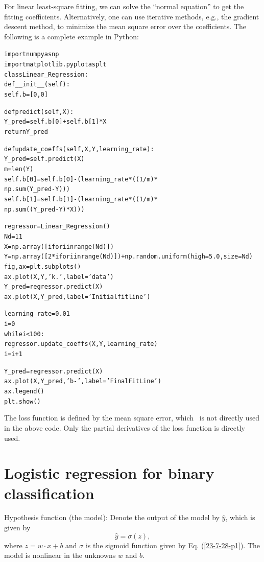 \documentclass{article}
\newenvironment{tmcode}[1][]{\begin{alltt} }{\end{alltt}}
\begin{document}
For linear least-square fitting, we can solve the ``normal equation'' to get
the fitting coefficients. Alternatively, one can use iterative methods, e.g.,
the gradient descent method, to minimize the mean square error over the
coefficients. The following is a complete example in Python:
\begin{tmcode}
import numpy as np
import matplotlib.pyplot as plt
class Linear_Regression:
    def __init__(self):
            self.b = [0, 0]
            
    def predict(self, X):
            Y_pred = self.b[0] + self.b[1]*X
            return Y_pred

    def update_coeffs(self, X, Y, learning_rate):
            Y_pred = self.predict(X)
            m = len(Y)
            self.b[0] = self.b[0] - (learning_rate * ((1/m) *
                                                      np.sum(Y_pred - Y)))
            self.b[1] = self.b[1] - (learning_rate * ((1/m) *
                                                      np.sum((Y_pred - Y) * X)))
 
 
regressor = Linear_Regression()
Nd=11
X = np.array([i for i in range(Nd)])
Y = np.array([2*i for i in range(Nd)]) + np.random.uniform(high=5.0,size=Nd)
fig, ax = plt.subplots()
ax.plot(X,Y, 'k.',label='data') 
Y_pred = regressor.predict(X)
ax.plot(X, Y_pred, label='Initial fit line')

learning_rate = 0.01
i = 0
while i<100:
    regressor.update_coeffs(X,Y,learning_rate)
    i = i+1

Y_pred = regressor.predict(X)
ax.plot(X, Y_pred, 'b-',label='Final Fit Line')
ax.legend()
plt.show()
\end{tmcode}
The loss function is defined by the mean square error, which \ is not directly
used in the above code. Only the partial derivatives of the loss function is
directly used.

\section{Logistic regression for binary classification}

Hypothesis function (the model): Denote the output of the model by $\hat{y}$,
which is given by
\begin{equation}
  \hat{y} = \sigma (z),
\end{equation}
where $z = w \cdot x + b$ and $\sigma$ is the sigmoid function given by Eq.
(\ref{23-7-28-p1}). The model is nonlinear in the unknowns $w$ and $b$.
\end{document}
